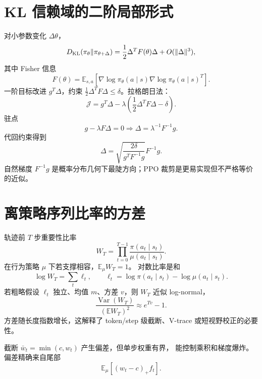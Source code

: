\documentclass[11pt]{article}
\numberwithin{equation}{section}
\newcommand{\E}{\mathbb{E}}
\newcommand{\1}{\mathbf{1}}
\newcommand{\Var}{\operatorname{Var}}
\begin{document}
\section{KL 信赖域的二阶局部形式}

对小参数变化 $\Delta\theta$，
\begin{equation}
 D_{\rm KL}(\pi_{\theta}\|\pi_{\theta+\Delta})
 =\frac12\Delta^TF(\theta)\Delta+O(\|\Delta\|^3),
\end{equation}
其中 Fisher 信息
\begin{equation}
 F(\theta)=\E_{s,a}
 [\nabla\log\pi_\theta(a\mid s)
 \nabla\log\pi_\theta(a\mid s)^T].
\end{equation}
一阶目标改进 $g^T\Delta$，约束
$\frac12\Delta^TF\Delta\le\delta$。拉格朗日法：
\begin{equation}
 \mathcal J=g^T\Delta-\lambda
 \left(\frac12\Delta^TF\Delta-\delta\right).
\end{equation}
驻点
\begin{equation}
 g-\lambda F\Delta=0
 \Rightarrow \Delta=\lambda^{-1}F^{-1}g.
\end{equation}
代回约束得到
\begin{equation}
 \boxed{\Delta=\sqrt{\frac{2\delta}{g^TF^{-1}g}}F^{-1}g.}
\end{equation}
自然梯度 $F^{-1}g$ 是概率分布几何下最陡方向；PPO 裁剪是更易实现但不严格等价的近似。

\section{离策略序列比率的方差}

轨迹前 $T$ 步重要性比率
\begin{equation}
 W_T=\prod_{t=0}^{T-1}
 \frac{\pi(a_t\mid s_t)}{\mu(a_t\mid s_t)}.
\end{equation}
在行为策略 $\mu$ 下若支撑相容，$\E_\mu W_T=1$。
对数比率是和
\begin{equation}
 \log W_T=\sum_t\ell_t,\qquad
 \ell_t=\log\pi(a_t\mid s_t)-\log\mu(a_t\mid s_t).
\end{equation}
若粗略假设 $\ell_t$ 独立、均值 $m$、方差 $v$，则
$W_T$ 近似 log-normal，
\begin{equation}
 \frac{\Var(W_T)}{(\E W_T)^2}\approx e^{Tv}-1.
\end{equation}
方差随长度指数增长，这解释了 token/step 级截断、V-trace 或短视野校正的必要性。

截断 $\bar w_t=\min(c,w_t)$ 产生偏差，但单步权重有界，
能控制乘积和梯度爆炸。偏差精确来自尾部
\begin{equation}
 \E_\mu[(w_t-c)_+f_t].
\end{equation}
\end{document}
